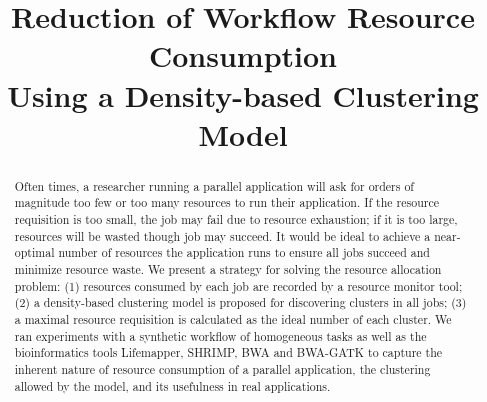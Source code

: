 \documentclass[conference]{IEEEtran}
\begin{document}
\title{Reduction of Workflow Resource Consumption \\ Using a Density-based Clustering Model \\
}

\author{
\and
{}
\and
{}
\and
{}

}

\maketitle

\begin{abstract}
Often times, a researcher running a parallel application will ask for orders of magnitude too few or too many resources to run their application. If the resource requisition is too small, the job may fail due to resource exhaustion; if it is too large, resources will be wasted though job may succeed. It would be ideal to achieve a near-optimal number of resources the application runs to ensure all jobs succeed and minimize resource waste. We present a strategy for solving the resource allocation problem: (1) resources consumed by each job are recorded by a resource monitor tool; (2) a density-based clustering model is proposed for discovering clusters in all jobs; (3) a maximal resource requisition is calculated as the ideal number of each cluster. We ran experiments with a synthetic workflow of homogeneous tasks as well as the bioinformatics tools Lifemapper, SHRIMP, BWA and BWA-GATK to capture the inherent nature of resource consumption of a parallel application, the clustering allowed by the model, and its usefulness in real applications.
\end{abstract}
\end{document}
